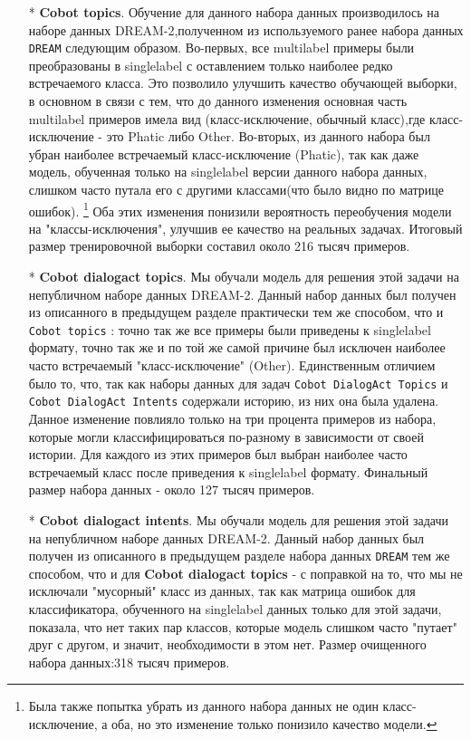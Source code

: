 \begin{itemize}
\item[*]\textbf{Cobot topics}. Обучение для данного набора данных производилось на наборе данных DREAM-2,полученном из используемого ранее набора данных \texttt{DREAM} следующим образом.
Во-первых, все multilabel примеры были преобразованы в singlelabel с оставлением только наиболее редко встречаемого класса. Это позволило улучшить качество обучающей выборки, в основном в связи с тем, что до данного изменения основная часть multilabel примеров имела вид (класс-исключение, обычный класс),где класс-исключение - это Phatic либо Other. Во-вторых, из данного набора был убран наиболее встречаемый класс-исключение (Phatic), так как даже модель, обученная только на singlelabel версии данного набора данных, слишком часто путала его с другими классами(что было видно по матрице ошибок). \footnote{Была также попытка убрать из данного набора данных не один класс-исключение, а оба, но это изменение только понизило качество модели.}
Оба этих изменения понизили вероятность переобучения модели на "классы-исключения", улучшив ее качество на реальных задачах. Итоговый размер тренировочной выборки составил около 216 тысяч примеров. 
\item[*]\textbf{Cobot dialogact topics}. Мы обучали модель для решения этой задачи на непубличном наборе данных DREAM-2. Данный набор данных был получен из  описанного в предыдущем разделе практически тем же способом, что и \texttt{Cobot topics} : точно так же все примеры были приведены к singlelabel формату, точно так же и по той же самой причине был исключен наиболее часто встречаемый "класс-исключение" (Other).
 Единственным отличием было то, что, так как наборы данных для задач \texttt{Cobot DialogAct Topics} и \texttt{Cobot DialogAct Intents} содержали историю, из них она была удалена. Данное изменение повлияло только на три процента примеров из набора, которые могли классифицироваться по-разному в зависимости от своей истории. Для каждого из этих примеров был выбран наиболее часто встречаемый класс после приведения к singlelabel формату. Финальный размер набора данных - около 127 тысяч примеров.

\item[*]\textbf{Cobot dialogact intents}. Мы обучали модель для решения этой задачи на непубличном наборе данных DREAM-2. Данный набор данных был получен из описанного в предыдущем разделе набора данных \texttt{DREAM} тем же способом, что и для \textbf{Cobot dialogact topics} - с поправкой на то, что мы не исключали "мусорный" класс из данных, так как матрица ошибок для классификатора, обученного на singlelabel данных только для этой задачи, показала, что нет таких пар классов, которые модель слишком часто "путает" друг с другом, и значит, необходимости в этом нет. Размер очищенного набора данных:318 тысяч примеров.
\end{itemize}
